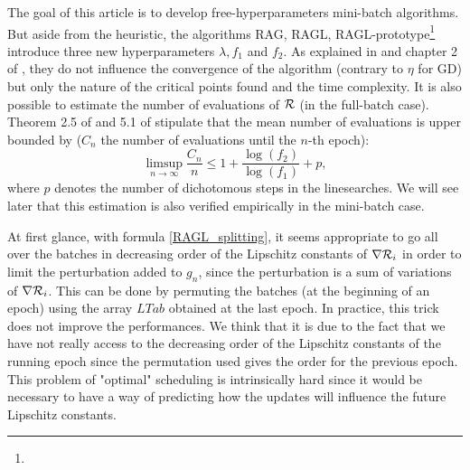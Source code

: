 \begin{remark}
  The goal of this article is to develop free-hyperparameters mini-batch algorithms. But aside from the heuristic, the algorithms RAG, RAGL, RAGL-prototype\footnote{} introduce three new hyperparameters $\lambda, f_1$ and $f_2$. As explained in \cite{Lyap_Theory_Bilel,Bilel_ICML} and chapter 2 of \cite{Bilel_thesis}, they do not influence the convergence of the algorithm (contrary to $\eta$ for GD) but only the nature of the critical points found and the time complexity. It is also possible to estimate the number of evaluations of $\mathcal{R}$ (in the full-batch case). Theorem 2.5 of \cite{Bilel_thesis} and 5.1 of \cite{Bilel_ICML} stipulate that the mean number of evaluations is upper bounded by ($C_n$ the number of evaluations until the $n$-th epoch):
\begin{equation}
	\displaystyle{\limsup_{n\to \infty}}\dfrac{C_n}{n} \leq 1+\frac{\log(f_2)}{\log(f_1)}+p,
	\label{complexity_law}
\end{equation}
where $p$ denotes the number of dichotomous steps in the linesearches. 
We will see later that this estimation is also verified empirically in the mini-batch case.
\end{remark}

\begin{remark}
	At first glance, with formula \eqref{RAGL_splitting}, it seems appropriate to go all over the batches in decreasing order of the Lipschitz constants of $\nabla \mathcal{R}_i$ in order to limit the perturbation added to $g_n$, since the perturbation is a sum of variations of $\nabla \mathcal{R}_i$. This can be done by permuting the batches (at the beginning of an epoch) using the array $LTab$ obtained at the last epoch. In practice, this trick does not improve the performances. We think that it is due to the fact that we have not really access to the decreasing order of the Lipschitz constants of the running epoch since the permutation used gives the order for the previous epoch. This problem of "optimal" scheduling is intrinsically hard since it would be necessary to have a way of predicting how the updates will influence the future Lipschitz constants.   
\end{remark}

